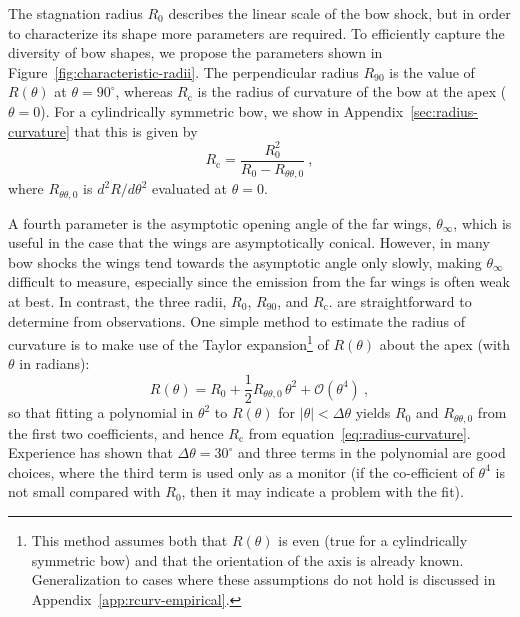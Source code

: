 \documentclass[useAMS, usenatbib, a4paper]{mnras}
\newcommand\C{\ensuremath{\mathrm{c}}}
\begin{document}
The stagnation radius \(R_0\) describes the linear scale of the bow
shock, but in order to characterize its shape more parameters are
required.  To efficiently capture the diversity of bow shapes, we
propose the parameters shown in Figure~\ref{fig:characteristic-radii}.
The perpendicular radius \(R_{90}\) is the value of \(R(\theta)\) at
\(\theta = 90^\circ\), whereas \(R_{\C}\) is the radius of curvature of the bow
at the apex (\(\theta = 0\)).  For a cylindrically symmetric bow, we show
in Appendix~\ref{sec:radius-curvature} that this is given by
\begin{equation}
  \label{eq:radius-curvature}
  R_{\C} 
  = \frac{R_0^2}{R_0 - R_{\theta\theta,0}} \ , 
\end{equation}
where \(R_{\theta\theta,0}\) is \(d^2 \!R / d\theta^2\) evaluated at \(\theta = 0\).

A fourth parameter is the asymptotic opening angle of the far wings,
\(\theta_\infty\), which is useful in the case that the wings are asymptotically
conical.  However, in many bow shocks the wings tend towards the
asymptotic angle only slowly, making \(\theta_\infty\) difficult to measure,
especially since the emission from the far wings is often weak at
best.  In contrast, the three radii, \(R_0\), \(R_{90}\), and
\(R_{\C}\). are straightforward to determine from observations.  One
simple method to estimate the radius of curvature is to make use of
the Taylor expansion\footnote{%
  This method assumes both that \(R(\theta)\) is even (true for a
  cylindrically symmetric bow) and that the orientation of the axis is
  already known.  Generalization to cases where these assumptions do
  not hold is discussed in Appendix~\ref{app:rcurv-empirical}.} %
of \(R(\theta)\) about the apex (with \(\theta\) in radians):
\begin{equation}
  \label{eq:taylor-R-theta}
  R(\theta) = R_0 + \frac12 R_{\theta\theta,0} \,\theta^2 + \mathcal{O}(\theta^4) \ ,
\end{equation}
so that fitting a polynomial in \(\theta^2\) to \(R(\theta)\) for
\(|\theta| < \Delta\theta \) yields \(R_0\) and \(R_{\theta\theta,0}\) from the first two
coefficients, and hence \(R_{\C}\) from
equation~\eqref{eq:radius-curvature}.  Experience has shown that
\(\Delta\theta = 30^\circ\) and three terms in the polynomial are good choices,
where the third term is used only as a monitor (if the co-efficient of
\(\theta^4\) is not small compared with \(R_0\), then it may indicate a
problem with the fit).
\end{document}
